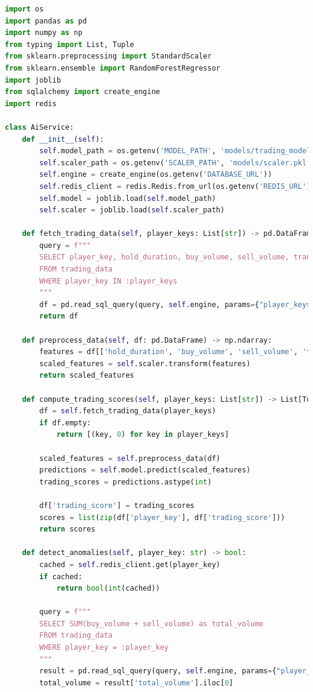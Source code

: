 \documentclass[11pt,a4paper]{article}
\begin{document}
\begin{lstlisting}[language=Python, caption={AI Service Layer}]
import os
import pandas as pd
import numpy as np
from typing import List, Tuple
from sklearn.preprocessing import StandardScaler
from sklearn.ensemble import RandomForestRegressor
import joblib
from sqlalchemy import create_engine
import redis

class AiService:
    def __init__(self):
        self.model_path = os.getenv('MODEL_PATH', 'models/trading_model.pkl')
        self.scaler_path = os.getenv('SCALER_PATH', 'models/scaler.pkl')
        self.engine = create_engine(os.getenv('DATABASE_URL'))
        self.redis_client = redis.Redis.from_url(os.getenv('REDIS_URL'))
        self.model = joblib.load(self.model_path)
        self.scaler = joblib.load(self.scaler_path)

    def fetch_trading_data(self, player_keys: List[str]) -> pd.DataFrame:
        query = f"""
        SELECT player_key, hold_duration, buy_volume, sell_volume, transaction_frequency
        FROM trading_data
        WHERE player_key IN :player_keys
        """
        df = pd.read_sql_query(query, self.engine, params={"player_keys": tuple(player_keys)})
        return df

    def preprocess_data(self, df: pd.DataFrame) -> np.ndarray:
        features = df[['hold_duration', 'buy_volume', 'sell_volume', 'transaction_frequency']].values
        scaled_features = self.scaler.transform(features)
        return scaled_features

    def compute_trading_scores(self, player_keys: List[str]) -> List[Tuple[str, int]]:
        df = self.fetch_trading_data(player_keys)
        if df.empty:
            return [(key, 0) for key in player_keys]

        scaled_features = self.preprocess_data(df)
        predictions = self.model.predict(scaled_features)
        trading_scores = predictions.astype(int)

        df['trading_score'] = trading_scores
        scores = list(zip(df['player_key'], df['trading_score']))
        return scores

    def detect_anomalies(self, player_key: str) -> bool:
        cached = self.redis_client.get(player_key)
        if cached:
            return bool(int(cached))

        query = f"""
        SELECT SUM(buy_volume + sell_volume) as total_volume
        FROM trading_data
        WHERE player_key = :player_key
        """
        result = pd.read_sql_query(query, self.engine, params={"player_key": player_key})
        total_volume = result['total_volume'].iloc[0]


\end{lstlisting}
\end{document}
